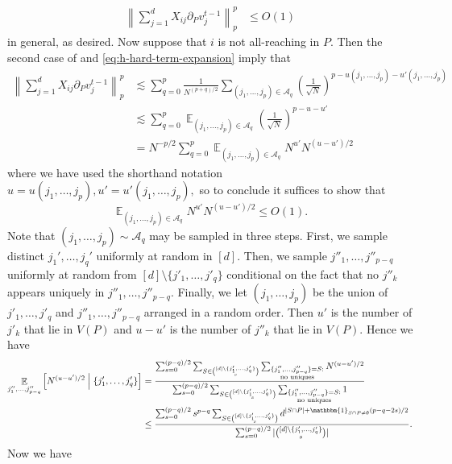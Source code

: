 \documentclass{article}
\newcommand{\1}{\mathbbm{1}}
\newcommand{\norm}[1]{\left\lVert#1\right\rVert}
\theoremstyle{plain}
\theoremstyle{definition}
\theoremstyle{remark}
\DeclareMathOperator*{\Eop}{\mathbb{E}}
\newcommand{\calA}{\mathcal{A}}
\begin{document}
\begin{align*}
    \norm{\sum_{j=1}^d X_{ij}\partial_P v_j^{t-1}}_p^p &\leq O(1)
\end{align*}
in general, as desired. Now suppose that $i$ is not all-reaching in $P$. Then the second case of  and \eqref{eq:h-hard-term-expansion} imply that
\begin{align*}
    \norm{\sum_{j=1}^d X_{ij}\partial_P v_j^{t-1}}_p^p &\lesssim \sum_{q=0}^p \frac{1}{N^{(p+q)/2}}\sum_{(j_1,\dots,j_p) \in \calA_q} \left(\frac{1}{\sqrt{N}}\right)^{p-u(j_1,\dots,j_p)-u'(j_1,\dots,j_p)} \\
    &\lesssim \sum_{q=0}^p \Eop_{(j_1,\dots,j_p) \in \calA_q} \left(\frac{1}{\sqrt{N}}\right)^{p-u-u'} \\
    &= N^{-p/2} \sum_{q=0}^p \Eop_{(j_1,\dots,j_p) \in \calA_q} N^{u'}N^{(u-u')/2}
\end{align*}
where we have used the shorthand notation $u = u(j_1,\dots,j_p),u'=u'(j_1,\dots,j_p),$ so to conclude it suffices to show that 
\[
\Eop_{(j_1,\dots,j_p) \in \calA_q} N^{u'}N^{(u-u')/2}\leq O(1).
\]
Note that $(j_1,\dots,j_p)\sim \calA_q$ may be sampled in three steps. First, we sample distinct $j_1',\dots,j_q'$ uniformly at random in $[d].$ Then, we sample $j''_1,\dots,j''_{p-q}$ uniformly at random from $[d]\setminus\{j'_1,\dots,j'_q\}$ conditional on the fact that no $j''_k$ appears uniquely in $j''_1,\dots,j''_{p-q}$. Finally, we let $(j_1,\dots,j_p)$ be the union of $j'_1,\dots,j'_q$ and $j''_1,\dots,j''_{p-q}$ arranged in a random order. Then $u'$ is the number of $j'_k$ that lie in $V(P)$ and $u-u'$ is the number of $j''_k$ that lie in $V(P).$ Hence we have
\begin{align*}
    \Eop_{j''_1,\dots,j''_{p-q}}\left[N^{(u-u')/2}\; \Big|\;\{j_1',\dots,j'_q\}\right] &=  \frac{\sum_{s=0}^{(p-q)/2}\sum_{S\in \binom{[d]\setminus \{j_1',\dots,j_q'\}}{s}} \sum_{\substack{\{j''_1,\dots,j''_{p-q} \} =  S: \\ \text{no uniques}}} N^{(u-u')/2} }
    {\sum_{s=0}^{(p-q)/2}\sum_{S\in \binom{[d]\setminus \{j_1',\dots,j_q'\}}{s}} \sum_{\substack{\{j''_1,\dots,j''_{p-q} \} =  S: \\ \text{no uniques}}} 1 } \\
    &\leq 
    \frac{\sum_{s=0}^{(p-q)/2}s^{p-q}\sum_{S\in \binom{[d]\setminus \{j_1',\dots,j_q'\}}{s}}  d^{|S\cap P| + \1_{S\cap P \neq \emptyset}(p-q-2s)/2} }
    {\sum_{s=0}^{(p-q)/2} |\binom{[d]\setminus \{j_1',\dots,j_q'\}}{s}| }.
\end{align*}
Now we have 
\end{document}

